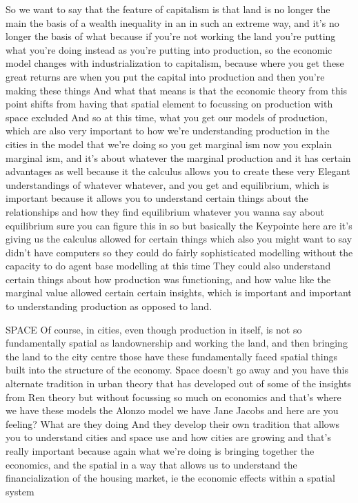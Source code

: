 So we want to say that the feature of capitalism is that land is no longer the main the basis of a wealth inequality in an in such an extreme way, and it’s no longer the basis of what because if you’re not working the land you’re putting what you’re doing instead as you’re putting into production, so the economic model changes with industrialization to capitalism, because where you get these great returns are when you put the capital into production and then you’re making these things
And what that means is that the economic theory from this point shifts from having that spatial element to focussing on production with space excluded
And so at this time, what you get our models of production, which are also very important to how we’re understanding production in the cities in the model that we’re doing so you get marginal ism now you explain marginal ism, and it’s about whatever the marginal production and it has certain advantages as well because it the calculus allows you to create these very Elegant understandings of whatever whatever, and you get and equilibrium, which is important because it allows you to understand certain things about the relationships and how they find equilibrium whatever you wanna say about equilibrium sure you can figure this in so but basically the Keypointe here are it’s giving us the calculus allowed for certain things which also you might want to say didn’t have computers so they could do fairly sophisticated modelling without the capacity to do agent base modelling at this time They could also understand certain things about how production was functioning, and how value like the marginal value allowed certain certain insights, which is important and important to understanding production as opposed to land.

SPACE
Of course, in cities, even though production in itself, is not so fundamentally spatial as landownership and working the land, and then bringing the land to the city centre those have these fundamentally faced spatial things built into the structure of the economy. Space doesn’t go away and you have this alternate tradition in urban theory that has developed out of some of the insights from Ren theory but without focussing so much on economics and that’s where we have these models the Alonzo model we have Jane Jacobs and here are you feeling? What are they doing And they develop their own tradition that allows you to understand cities and space use and how cities are growing and that’s really important because again what we’re doing is bringing together the economics, and the spatial in a way that allows us to understand the financialization of the housing market, ie the economic effects within a spatial system

